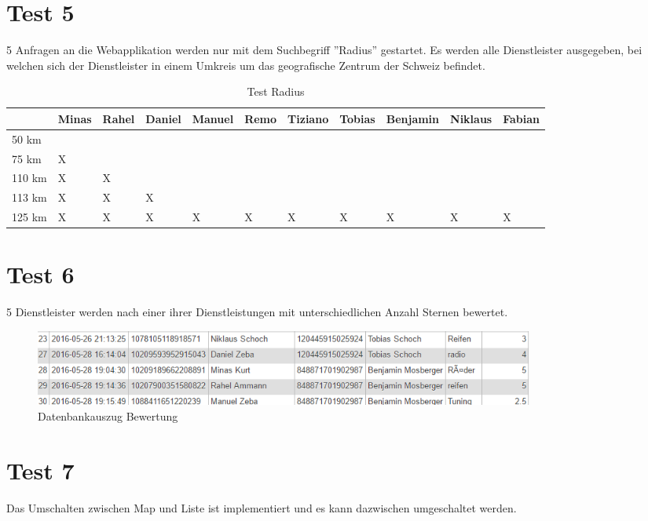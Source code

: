 \documentclass[11pt,a4paper]{scrreprt}
\begin{document}
{\section{Test 5}

5 Anfragen an die Webapplikation werden nur mit dem Suchbegriff ''Radius'' gestartet. 
Es werden alle Dienstleister ausgegeben, bei welchen sich der Dienstleister in einem Umkreis um das geografische Zentrum der Schweiz befindet.

\begin{table}[H]
\begin{tabular}{|p{2.4cm}|p{0.9cm}| p{0.9cm}|p{1.0cm}|p{1.1cm}|p{0.9cm}|p{1.2cm}|p{1.2cm}|p{1.5cm}|p{1.1cm}|p{1.1cm}|}\hline      			& Minas 	&  Rahel & Daniel   & Manuel 	&  Remo  & Tiziano   & Tobias   & Benjamin   &  Niklaus  &  Fabian    \\ \hline
  50 km	  		&     &     &     &     &     &     &     &     &     &       \\ \hline
  75 km			&  X  &     &     &     &     &     &     &     &     &       \\ \hline
  110 km		&  X  &  X  &     &     &     &     &     &     &     &       \\ \hline
  113 km		&  X  &  X  &  X  &     &     &     &     &     &     &       \\ \hline
  125 km		&  X  &  X  &  X  &  X  &  X  &  X  &  X  &  X  &  X  &  X    \\ \hline
 \end{tabular}       
\caption{Test Radius}       
\end{table}      
\newpage
\section{Test 6}
5 Dienstleister werden nach einer ihrer Dienstleistungen mit unterschiedlichen Anzahl Sternen bewertet.
\begin{figure}[H]
\includegraphics[height=2.5cm]{./Bilder/bewertung.png}
\centering
\caption{Datenbankauszug Bewertung}
\end{figure}

\section{Test 7}
Das Umschalten zwischen Map und Liste ist implementiert und es kann dazwischen umgeschaltet werden.
}
\end{document}
